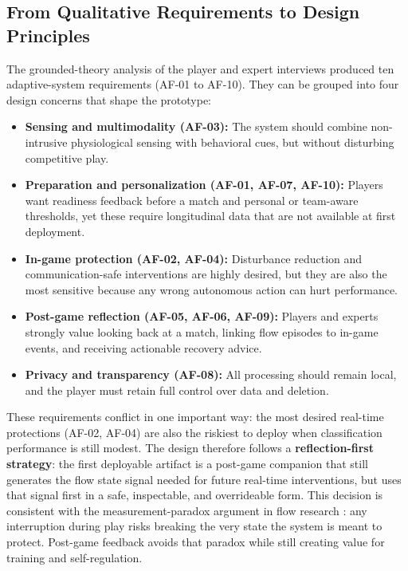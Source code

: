\subsection{From Qualitative Requirements to Design Principles}

The grounded-theory analysis of the player and expert interviews produced ten adaptive-system requirements (AF-01 to AF-10). They can be grouped into four design concerns that shape the prototype:

\begin{itemize}
    \item \textbf{Sensing and multimodality (AF-03):} The system should combine non-intrusive physiological sensing with behavioral cues, but without disturbing competitive play.
    \item \textbf{Preparation and personalization (AF-01, AF-07, AF-10):} Players want readiness feedback before a match and personal or team-aware thresholds, yet these require longitudinal data that are not available at first deployment.
    \item \textbf{In-game protection (AF-02, AF-04):} Disturbance reduction and communication-safe interventions are highly desired, but they are also the most sensitive because any wrong autonomous action can hurt performance.
    \item \textbf{Post-game reflection (AF-05, AF-06, AF-09):} Players and experts strongly value looking back at a match, linking flow episodes to in-game events, and receiving actionable recovery advice.
    \item \textbf{Privacy and transparency (AF-08):} All processing should remain local, and the player must retain full control over data and deletion.
\end{itemize}

These requirements conflict in one important way: the most desired real-time protections (AF-02, AF-04) are also the riskiest to deploy when classification performance is still modest. The design therefore follows a \textbf{reflection-first strategy}: the first deployable artifact is a post-game companion that still generates the flow state signal needed for future real-time interventions, but uses that signal first in a safe, inspectable, and overrideable form. This decision is consistent with the measurement-paradox argument in flow research \autocite{9296229}: any interruption during play risks breaking the very state the system is meant to protect. Post-game feedback avoids that paradox while still creating value for training and self-regulation.

